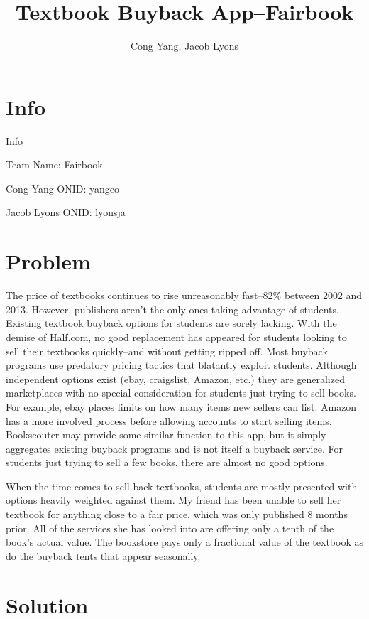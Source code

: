 \documentclass[12pt]{article}
\title{Textbook Buyback App--Fairbook}
\author{Cong Yang, Jacob Lyons}
\begin{document}
	\maketitle

	\tableofcontents
                \section{Info}
		Info \par
		Team Name: Fairbook \par
		Cong Yang ONID: yangco \par
		Jacob Lyons ONID: lyonsja \par


	\section{Problem}
	The price of textbooks continues to rise unreasonably fast--82\% between 2002 and 2013.
	\cite{cnbc} 
	However, publishers aren't the only ones taking advantage of students. 
	Existing textbook buyback options for students are sorely lacking. With the demise of Half.com, 
	no good replacement has appeared for students looking to sell their textbooks quickly--and without 
	getting ripped off.	
        Most buyback programs use predatory pricing tactics that blatantly exploit students. Although independent options 
	exist (ebay, craigslist, Amazon, etc.) they are
	generalized marketplaces with no special consideration for students just trying to sell books. For example,
	ebay places limits on how many items new sellers can list. 
	Amazon has a more involved process before allowing accounts to start selling items.
	Bookscouter may provide some similar function to this app, but it simply aggregates existing buyback programs and is not itself
	a buyback service.
 	For students just trying to sell a few books,
	there are almost no good options.\par
	
	When the time comes to sell back textbooks, students are mostly presented with options heavily weighted
	against them. My friend has been unable to sell her textbook for anything close to a fair price, which was only published 8 months prior.
	All of the services she has looked into are offering only a tenth of the book's actual value. The bookstore pays only
	a fractional value of the textbook as do the buyback tents that appear seasonally. \par
		

	\section{Solution}
\end{document}
